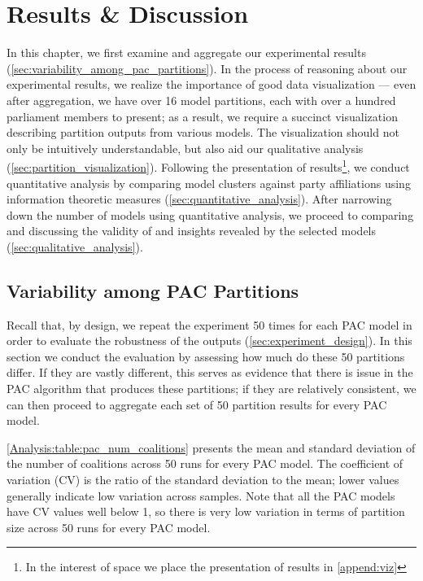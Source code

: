 
\chapter{Results \& Discussion}
\label{ch:analysis}

In this chapter, we first examine and aggregate our experimental results
(\autoref{sec:variability_among_pac_partitions}).
In the process of reasoning about our experimental results, we realize the
importance of good data visualization --- even after aggregation, we have over
16 model partitions, each with over a hundred parliament members to present;
as a result, we require a succinct visualization describing partition outputs
from various models.
The visualization should not only be intuitively understandable, but also aid
our qualitative analysis (\autoref{sec:partition_visualization}).
Following the presentation of results\footnote{In the interest of space we
place the presentation of results in \autoref{append:viz}}, we conduct
quantitative analysis by comparing model clusters against party affiliations
using information theoretic measures (\autoref{sec:quantitative_analysis}).
After narrowing down the number of models using quantitative analysis, we
proceed to comparing and discussing the validity of and insights revealed by
the selected models (\autoref{sec:qualitative_analysis}).


\section{Variability among PAC Partitions}
\label{sec:variability_among_pac_partitions}
Recall that, by design, we repeat the experiment 50 times for each PAC model
in order to evaluate the robustness of the outputs (\autoref{sec:experiment_design}).
In this section we conduct the evaluation by assessing how much do these 50
partitions differ.
If they are vastly different, this serves as evidence that there is issue in the
PAC algorithm that produces these partitions; if they are relatively consistent,
we can then proceed to aggregate each set of 50 partition results for every PAC
model.

\autoref{Analysis:table:pac_num_coalitions} presents the mean and standard
deviation of the number of coalitions across 50 runs for every PAC model.
The coefficient of variation (CV) is the ratio of the standard deviation to the mean; lower values generally indicate low variation across samples.
Note that all the PAC models have CV values well below 1, so there is very low
variation in terms of partition size across 50 runs for every PAC model.

